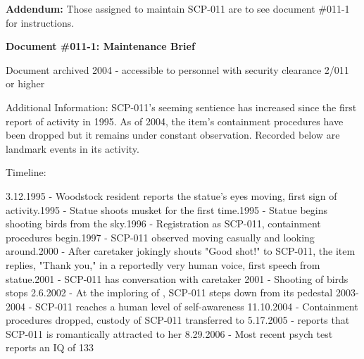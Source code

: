 \textbf{Addendum:} Those assigned to maintain SCP-011 are to see document \#011-1 for instructions.

\begin{leftbar}
\textbf{Document \#011-1: Maintenance Brief}

\lb Document archived 2004 - accessible to personnel with security clearance 2/011 or higher\rb

Additional Information: SCP-011's seeming sentience has increased since the first report of activity in 1995. As of 2004, the item's containment procedures have been dropped but it remains under constant observation. Recorded below are landmark events in its activity.

Timeline:
\begin{flushleft}
3.12.1995 - Woodstock resident reports the statue's eyes moving, first sign of activity.1995 - Statue shoots musket for the first time.1995 - Statue begins shooting birds from the sky.1996 - Registration as SCP-011, containment procedures begin.1997 - SCP-011 observed moving casually and looking around.2000 - After caretaker   jokingly shouts "Good shot!" to SCP-011, the item replies, "Thank you," in a reportedly very human voice, first speech from statue.2001 - SCP-011 has conversation with caretaker  
2001 - Shooting of birds stops
2.6.2002 - At the imploring of  , SCP-011 steps down from its pedestal
2003-2004 - SCP-011 reaches a human level of self-awareness
11.10.2004 - Containment procedures dropped, custody of SCP-011 transferred to  
5.17.2005 -   reports that SCP-011 is romantically attracted to her
8.29.2006 - Most recent psych test reports an IQ of 133
\end{flushleft}
\end{leftbar}